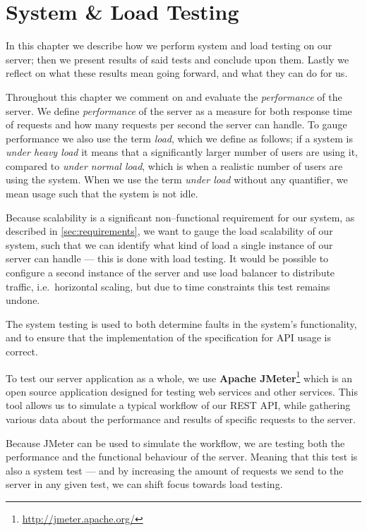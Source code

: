 \chapter{System \& Load Testing}\label{cha:system_and_load_testing}
In this chapter we describe how we perform system and load testing on our server;
then we present results of said tests and conclude upon them.
Lastly we reflect on what these results mean going forward, and what they can do for us.

Throughout this chapter we comment on and evaluate the \textit{performance} of the server.
We define \textit{performance} of the server as a measure for both response time of requests and how many requests per second the server can handle.
To gauge performance we also use the term \textit{load}, which we define as follows;
if a system is \textit{under heavy load} it means that a significantly larger number of users are using it, compared to \textit{under normal load}, which is when a realistic number of users are using the system.
When we use the term \textit{under load} without any quantifier, we mean usage such that the system is not idle.

\bigskip
Because scalability is a significant non--functional requirement for our system, as described in \cref{sec:requirements}, we want to gauge the load scalability of our system, such that we can identify what kind of load a single instance of our server can handle --- this is done with load testing. %
It would be possible to configure a second instance of the server and use load balancer to distribute traffic, i.e.~horizontal scaling, but due to time constraints this test remains undone.

The system testing is used to both determine faults in the system's functionality, and to ensure that the implementation of the specification for API usage is correct.

\bigskip
To test our server application as a whole, we use \textbf{Apache JMeter}\footnote{\url{http://jmeter.apache.org/}} which is an open source application designed for testing web services and other services.
This tool allows us to simulate a typical workflow of our REST API, while gathering various data about the performance and results of specific requests to the server.

Because JMeter can be used to simulate the workflow, we are testing both the performance and the functional behaviour of the server.
Meaning that this test is also a system test --- and by increasing the amount of requests we send to the server in any given test, we can shift focus towards load testing.

